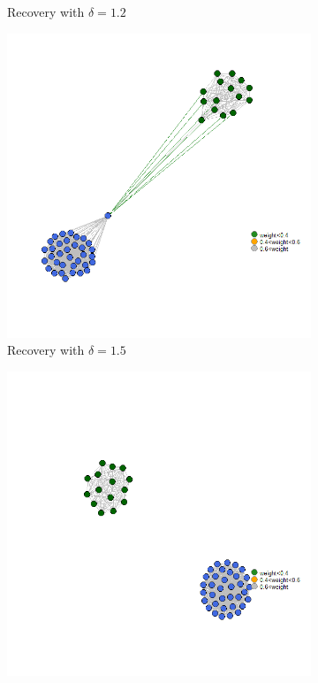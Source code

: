\documentclass[12pt]{amsart}
\theoremstyle{remark}
\begin{document}
\begin{figure}[h]
\begin{subfigure}[b]{0.37\textwidth}
         \caption{Recovery with $\delta=1.2$}
     \end{subfigure}
     	\hfill
     \begin{subfigure}[b]{0.37\textwidth}
         \centering
         \includegraphics[width=\textwidth]{./Pictures/recupera5.png}
         \caption{Recovery with $\delta=1.5$}
     \end{subfigure}
     \hfill
     \begin{subfigure}[b]{0.37\textwidth}
         \centering
         \includegraphics[width=\textwidth]{./Pictures/recupera6.png}

\end{subfigure}
\end{figure}
\end{document}
